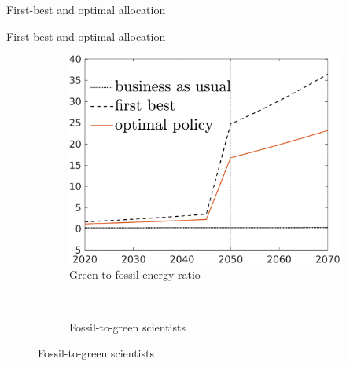 \documentclass[11pt,aspectratio=169]{beamer}
\begin{document}
\begin{frame}{First-best and optimal allocation}
\begin{figure}[h!!]
\begin{subfigure}{0.45\textwidth}
		\end{subfigure}
	\end{figure}
\end{frame}

\addtocounter{framenumber}{-1}
\begin{frame}{First-best and optimal allocation}
	\hypertarget{compfb}{}
	\begin{figure}[h!!]
		\centering
		\begin{subfigure}{0.45\textwidth}		
			\caption{Green-to-fossil energy ratio}
			\includegraphics[width=1\textwidth]{../codding_model/own_basedOnFried/optimalPol_010922_revision/figures/all_13Sept22/NewCalib_effBauOpt_T_GFF_Sun2_emnet1_spillover0_knspil3_xgr0_nsk0_sep0_extern0_PV1_etaa0.79_lgd1.png}
		\end{subfigure}
		\begin{minipage}[]{0.05\textwidth}
			\
		\end{minipage}
		\begin{subfigure}{0.45\textwidth}		
			\caption{{Fossil-to-green scientists}}

\end{subfigure}
\end{figure}
\end{frame}
\end{document}
